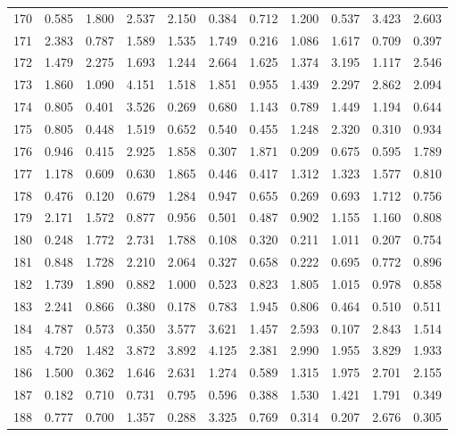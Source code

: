 \begin{tabular}{lrrrrrrrrrr}
170 &  0.585 &  1.800 &  2.537 &  2.150 &  0.384 &  0.712 &  1.200 &  0.537 &  3.423 &  2.603 \\
171 &  2.383 &  0.787 &  1.589 &  1.535 &  1.749 &  0.216 &  1.086 &  1.617 &  0.709 &  0.397 \\
172 &  1.479 &  2.275 &  1.693 &  1.244 &  2.664 &  1.625 &  1.374 &  3.195 &  1.117 &  2.546 \\
173 &  1.860 &  1.090 &  4.151 &  1.518 &  1.851 &  0.955 &  1.439 &  2.297 &  2.862 &  2.094 \\
174 &  0.805 &  0.401 &  3.526 &  0.269 &  0.680 &  1.143 &  0.789 &  1.449 &  1.194 &  0.644 \\
175 &  0.805 &  0.448 &  1.519 &  0.652 &  0.540 &  0.455 &  1.248 &  2.320 &  0.310 &  0.934 \\
176 &  0.946 &  0.415 &  2.925 &  1.858 &  0.307 &  1.871 &  0.209 &  0.675 &  0.595 &  1.789 \\
177 &  1.178 &  0.609 &  0.630 &  1.865 &  0.446 &  0.417 &  1.312 &  1.323 &  1.577 &  0.810 \\
178 &  0.476 &  0.120 &  0.679 &  1.284 &  0.947 &  0.655 &  0.269 &  0.693 &  1.712 &  0.756 \\
179 &  2.171 &  1.572 &  0.877 &  0.956 &  0.501 &  0.487 &  0.902 &  1.155 &  1.160 &  0.808 \\
180 &  0.248 &  1.772 &  2.731 &  1.788 &  0.108 &  0.320 &  0.211 &  1.011 &  0.207 &  0.754 \\
181 &  0.848 &  1.728 &  2.210 &  2.064 &  0.327 &  0.658 &  0.222 &  0.695 &  0.772 &  0.896 \\
182 &  1.739 &  1.890 &  0.882 &  1.000 &  0.523 &  0.823 &  1.805 &  1.015 &  0.978 &  0.858 \\
183 &  2.241 &  0.866 &  0.380 &  0.178 &  0.783 &  1.945 &  0.806 &  0.464 &  0.510 &  0.511 \\
184 &  4.787 &  0.573 &  0.350 &  3.577 &  3.621 &  1.457 &  2.593 &  0.107 &  2.843 &  1.514 \\
185 &  4.720 &  1.482 &  3.872 &  3.892 &  4.125 &  2.381 &  2.990 &  1.955 &  3.829 &  1.933 \\
186 &  1.500 &  0.362 &  1.646 &  2.631 &  1.274 &  0.589 &  1.315 &  1.975 &  2.701 &  2.155 \\
187 &  0.182 &  0.710 &  0.731 &  0.795 &  0.596 &  0.388 &  1.530 &  1.421 &  1.791 &  0.349 \\
188 &  0.777 &  0.700 &  1.357 &  0.288 &  3.325 &  0.769 &  0.314 &  0.207 &  2.676 &  0.305 \\

\end{tabular}
